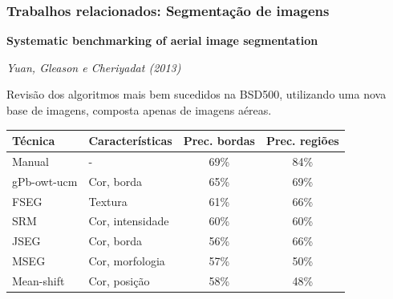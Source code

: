 \documentclass[t]{beamer}
\begin{document}
\begin{frame}
	\frametitle{Trabalhos relacionados: Segmentação de imagens}

	\textbf{Systematic benchmarking of aerial image segmentation}
	
	\textit{Yuan, Gleason e Cheriyadat (2013)}
	
	\vspace{.5cm}
	
	Revisão dos algoritmos mais bem sucedidos na BSD500, utilizando uma nova base de imagens, composta apenas de imagens aéreas.
	
	\small{
	\begin{table}[h]
	\centering
	\begin{tabulary}{\linewidth}{|L|L|C|C|}
	\hline
	\textbf{Técnica} & \textbf{Características} & \textbf{Prec. bordas} & \textbf{Prec. regiões } \\ \hline
	Manual      & \hspace{1cm} -    & 69\% & 84\% \\ \hline
	gPb-owt-ucm & Cor, borda       & 65\% & 69\% \\ \hline
	FSEG        & Textura          & 61\% & 66\% \\ \hline
	SRM         & Cor, intensidade & 60\% & 60\% \\ \hline
	JSEG        & Cor, borda       & 56\% & 66\% \\ \hline
	MSEG        & Cor, morfologia  & 57\% & 50\% \\ \hline
	Mean-shift  & Cor, posição     & 58\% & 48\% \\ \hline
	\end{tabulary}
	\end{table}
	}

\end{frame}
\end{document}
